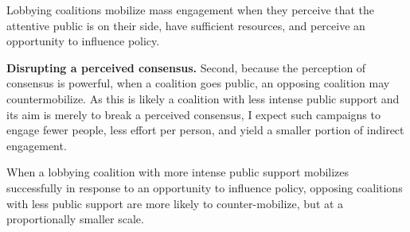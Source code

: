 \begin{subhyp}

\begin{hyp}
Lobbying coalitions mobilize mass engagement when they perceive that the attentive public is on their side, have sufficient resources, and perceive an opportunity to influence policy.
\end{hyp}

\textbf{Disrupting a perceived consensus.} Second, because the perception of consensus is powerful, when a coalition goes public, an opposing coalition may countermobilize. As this is likely a coalition with less intense public support and its aim is merely to break a perceived consensus, I expect such campaigns to engage fewer people, less effort per person, and yield a smaller portion of indirect engagement.


\begin{hyp}
When a lobbying coalition with more intense public support mobilizes successfully in response to an opportunity to influence policy, opposing coalitions with less public support are more likely to counter-mobilize, but at a proportionally smaller scale.
\end{hyp}


\end{subhyp}
